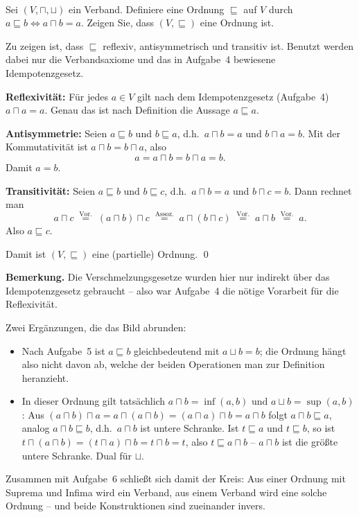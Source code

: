 \\
Sei $(V,\sqcap,\sqcup)$ ein Verband. Definiere eine Ordnung $\sqsubseteq$ auf $V$ durch $a\sqsubseteq b \Leftrightarrow a\sqcap b = a$. Zeigen Sie, dass $(V,\sqsubseteq)$ eine Ordnung ist.

\begin{loesung}
Zu zeigen ist, dass $\sqsubseteq$ reflexiv, antisymmetrisch und transitiv ist. Benutzt werden dabei nur die Verbandsaxiome und das in Aufgabe~4 bewiesene Idempotenzgesetz.

\textbf{Reflexivität:} Für jedes $a\in V$ gilt nach dem Idempotenzgesetz (Aufgabe~4) $a\sqcap a=a$. Genau das ist nach Definition die Aussage $a\sqsubseteq a$. \checkmark

\textbf{Antisymmetrie:} Seien $a\sqsubseteq b$ und $b\sqsubseteq a$, d.h.\ $a\sqcap b=a$ und $b\sqcap a=b$. Mit der Kommutativität ist $a\sqcap b=b\sqcap a$, also
\[a=a\sqcap b=b\sqcap a=b.\]
Damit $a=b$. \checkmark

\textbf{Transitivität:} Seien $a\sqsubseteq b$ und $b\sqsubseteq c$, d.h.\ $a\sqcap b=a$ und $b\sqcap c=b$. Dann rechnet man
\[a\sqcap c \;\overset{\text{Vor.}}{=}\; (a\sqcap b)\sqcap c \;\overset{\text{Assoz.}}{=}\; a\sqcap(b\sqcap c) \;\overset{\text{Vor.}}{=}\; a\sqcap b \;\overset{\text{Vor.}}{=}\; a.\]
Also $a\sqsubseteq c$. \checkmark

Damit ist $(V,\sqsubseteq)$ eine (partielle) Ordnung. \qed

\textbf{Bemerkung.} Die Verschmelzungsgesetze wurden hier nur indirekt über das Idempotenzgesetz gebraucht -- also war Aufgabe~4 die nötige Vorarbeit für die Reflexivität.

Zwei Ergänzungen, die das Bild abrunden:
\begin{itemize}
  \item Nach Aufgabe~5 ist $a\sqsubseteq b$ gleichbedeutend mit $a\sqcup b=b$; die Ordnung hängt also nicht davon ab, welche der beiden Operationen man zur Definition heranzieht.
  \item In dieser Ordnung gilt tatsächlich $a\sqcap b=\inf(a,b)$ und $a\sqcup b=\sup(a,b)$: Aus $(a\sqcap b)\sqcap a = a\sqcap(a\sqcap b)=(a\sqcap a)\sqcap b=a\sqcap b$ folgt $a\sqcap b\sqsubseteq a$, analog $a\sqcap b\sqsubseteq b$, d.h.\ $a\sqcap b$ ist untere Schranke. Ist $t\sqsubseteq a$ und $t\sqsubseteq b$, so ist $t\sqcap(a\sqcap b)=(t\sqcap a)\sqcap b=t\sqcap b=t$, also $t\sqsubseteq a\sqcap b$ -- $a\sqcap b$ ist die größte untere Schranke. Dual für $\sqcup$.
\end{itemize}
Zusammen mit Aufgabe~6 schließt sich damit der Kreis: Aus einer Ordnung mit Suprema und Infima wird ein Verband, aus einem Verband wird eine solche Ordnung -- und beide Konstruktionen sind zueinander invers.
\end{loesung}





